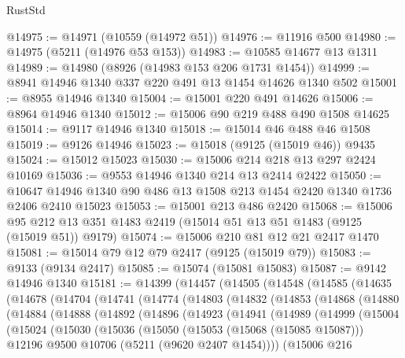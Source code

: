 \begin{lexlean}{RustStd}
\begin{coremodule}
@14975 := @14971 (@10559 (@14972 @51))
@14976 := @11916 @500
@14980 := @14975 (@5211 (@14976 @53 @153))
@14983 := @10585 @14677 @13 @1311
@14989 := @14980 (@8926 (@14983 @153 @206 @1731 @1454))
@14999 := @8941 @14946 @1340 @337 @220 @491 @13 @1454 @14626 @1340 @502
@15001 := @8955 @14946 @1340
@15004 := @15001 @220 @491 @14626
@15006 := @8964 @14946 @1340
@15012 := @15006 @90 @219 @488 @490 @1508 @14625
@15014 := @9117 @14946 @1340
@15018 := @15014 @46 @488 @46 @1508
@15019 := @9126 @14946
@15023 := @15018 (@9125 (@15019 @46)) @9435
@15024 := @15012 @15023
@15030 := @15006 @214 @218 @13 @297 @2424 @10169
@15036 := @9553 @14946 @1340 @214 @13 @2414 @2422
@15050 := @10647 @14946 @1340 @90 @486 @13 @1508 @213 @1454 @2420 @1340 @1736 @2406 @2410 @15023
@15053 := @15001 @213 @486 @2420
@15068 := @15006 @95 @212 @13 @351 @1483 @2419 (@15014 @51 @13 @51 @1483 (@9125 (@15019 @51)) @9179)
@15074 := @15006 @210 @81 @12 @21 @2417 @1470
@15081 := @15014 @79 @12 @79 @2417 (@9125 (@15019 @79))
@15083 := @9133 (@9134 @2417)
@15085 := @15074 (@15081 @15083)
@15087 := @9142 @14946 @1340
@15181 := @14399
    (@14457
      (@14505
        (@14548
          (@14585
            (@14635
              (@14678
                (@14704
                  (@14741
                    (@14774
                      (@14803
                        (@14832
                          (@14853
                            (@14868
                              (@14880
                                (@14884
                                  (@14888
                                    (@14892
                                      (@14896
                                        (@14923
                                          (@14941
                                            (@14989
                                              (@14999
                                                (@15004
                                                  (@15024
                                                    (@15030
                                                      (@15036
                                                        (@15050
                                                          (@15053 (@15068 (@15085 @15087)))
                                                          @12196
                                                          @9500
                                                          @10706
                                                          (@5211 (@9620 @2407 @1454))))
                                                      (@15006
                                                        @216

\end{coremodule}
\end{lexlean}
